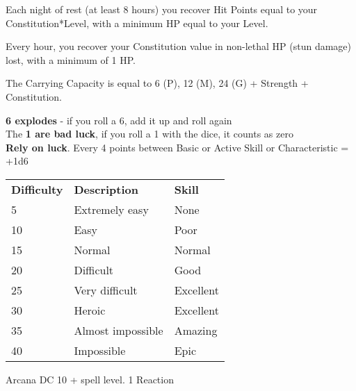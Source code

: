 \documentclass[landscape,10pt,a4paper]{article}
\begin{document}
\begin{multicols}{3}
\begin{dmbox}[title=Rest 8 hours - page \pageref{recuperarepf}]
Each night of rest (at least 8 hours) you recover Hit Points equal to your Constitution*Level, with a minimum HP equal to your Level.
\end{dmbox}


\begin{dmbox}[title=Non-lethal damage - page \pageref{nonlethalhitpointrecovery}]
Every hour, you recover your Constitution value in non-lethal HP (stun damage) lost, with a minimum of 1 HP.
\end{dmbox}



\begin{dmbox}[title=Carrying Capacity (CdC) - page \pageref{carryingcapacity}]
The Carrying Capacity is equal to 6 (P), 12 (M), 24 (G) + Strength + Constitution.
\end{dmbox}


\begin{dmbox}[title=Golden Rules - page \pageref{goldenrules}]
{\textbf{6 explodes}} - if you roll a 6, add it up and roll again\\
The \textbf{1 are bad luck}, if you roll a 1 with the dice, it counts as zero\\
\textbf{Rely on luck}. Every 4 points between Basic or Active Skill or Characteristic = +1d6
\end{dmbox}



\begin{dmbox}[title=Difficulty and Skill - page \pageref{basedifficolta}]
\begin{tabular}{lll}
\textbf{Difficulty} & \textbf{Description} & \textbf{Skill} \\
5 & Extremely easy & None\\
10 & Easy & Poor\\
15 & Normal & Normal\\
20 & Difficult & Good\\
25 & Very difficult & Excellent\\
30 & Heroic & Excellent\\
35 & Almost impossible & Amazing\\
40 & Impossible & Epic\\
\end{tabular}
\end{dmbox}


\begin{dmbox}[title=Recognising a spell - page \pageref{recognising spell}]
Arcana DC 10 + spell level. 1 Reaction
\end{dmbox}



\end{multicols}
\end{document}
